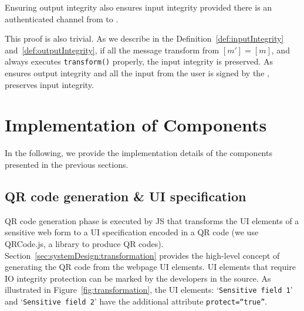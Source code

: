 \begin{theorem}
\label{theorem:th3}
Ensuring output integrity also ensures input integrity provided there is an authenticated channel from \user to \server.
\end{theorem}

\begin{IEEEproof}
This proof is also trivial. As we describe in the Definition~\ref{def:inputIntegrity} and~\ref{def:outputIntegrity}, if all the message transform from \host $[m']=[m]$, and \host always executes \texttt{transform()} properly, the input integrity is preserved. As \name ensures output integrity and all the input from the user is signed by the \device, \name preserves input integrity. 
\end{IEEEproof}



\section*{Implementation of \name Components}
\label{appendix:implementation}


In the following, we provide the implementation details of the \name components presented in the previous sections. 

\subsection{\bfseries QR code generation \& UI specification}
\label{sec:prototype:impl:qr}

QR code generation phase is executed by \name JS that transforms the UI elements of a sensitive web form to a UI specification encoded in a QR code (we use QRCode.js, a \js library to produce QR codes). Section~\ref{sec:systemDesign:transformation} provides the high-level concept of generating the QR code from the webpage UI elements. UI elements that require IO integrity protection can be marked by the developers in the \html source. As illustrated in Figure~\ref{fig:transformation}, the \html UI elements: `\texttt{Sensitive field 1}' and `\texttt{Sensitive field 2}' have the additional attribute \texttt{protect=``true''}. %

